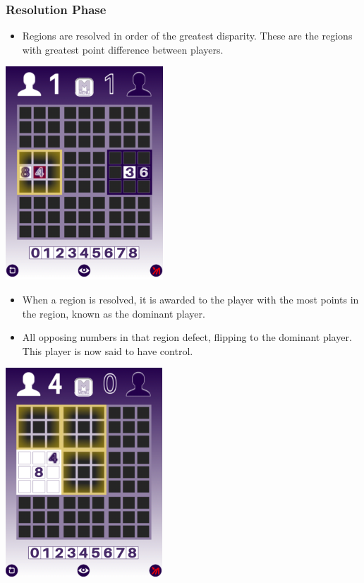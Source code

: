 \documentclass[a4paper]{article}
\begin{document}
\pagebreak
\subsubsection{Resolution Phase}

\begin{itemize}
    \item Regions are resolved in order of the greatest disparity. These are the regions with greatest point 
    difference between players.
\end{itemize}
\begin{center}
    \includegraphics[scale=0.5]{img/tutorial_4.png}
\end{center}

\begin{itemize}
    \item When a region is resolved, it is awarded to the player with the most points in the region, known as the dominant player.
    \item All opposing numbers in that region defect, flipping to the dominant player. This player is now said to have control.
\end{itemize}
\begin{center}
    \includegraphics[scale=0.5]{img/tutorial_5.png}
\end{center}
\end{document}
